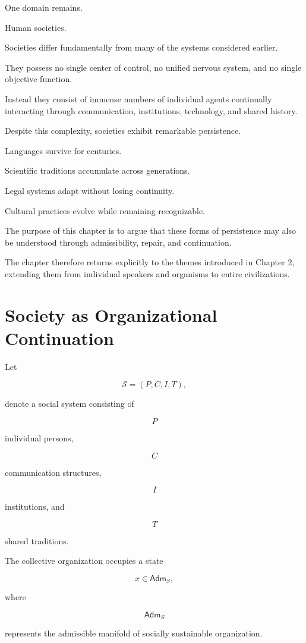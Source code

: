 \documentclass[11pt,oneside]{book}
\numberwithin{equation}{chapter}
\theoremstyle{definition}
\theoremstyle{plain}
\newcommand{\Adm}{\mathsf{Adm}}
\begin{document}
One domain remains.

Human societies.

Societies differ fundamentally from many of the systems considered
earlier.

They possess no single center of control, no unified nervous system, and
no single objective function.

Instead they consist of immense numbers of individual agents continually
interacting through communication, institutions, technology, and shared
history.

Despite this complexity, societies exhibit remarkable persistence.

Languages survive for centuries.

Scientific traditions accumulate across generations.

Legal systems adapt without losing continuity.

Cultural practices evolve while remaining recognizable.

The purpose of this chapter is to argue that these forms of persistence may
also be understood through admissibility, repair, and continuation.

The chapter therefore returns explicitly to the themes introduced in
Chapter 2, extending them from individual speakers and organisms to entire
civilizations.

\section{Society as Organizational Continuation}

Let

\[
\mathcal S
=
(P,C,I,T),
\]

denote a social system consisting of

\[
P
\]

individual persons,

\[
C
\]

communication structures,

\[
I
\]

institutions, and

\[
T
\]

shared traditions.

The collective organization occupies a state

\[
x
\in
\Adm_S,
\]

where

\[
\Adm_S
\]

represents the admissible manifold of socially sustainable organization.
\end{document}
